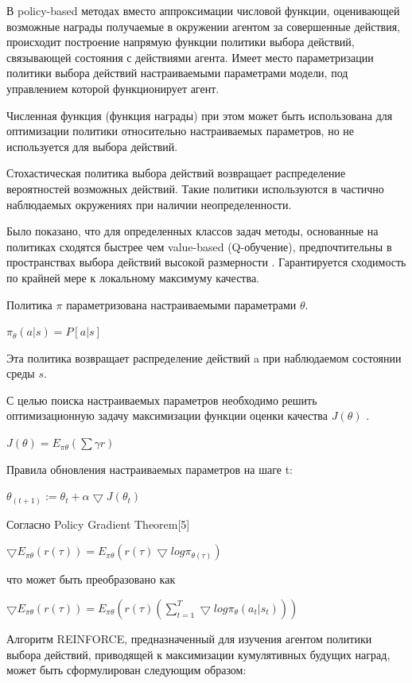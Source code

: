 В policy-based методах вместо аппроксимации числовой функции, оценивающей возможные награды получаемые в окружении агентом за совершенные действия, происходит построение напрямую функции политики выбора действий, связывающей состояния с действиями агента. Имеет место параметризации политики выбора действий настраиваемыми параметрами модели, под управлением которой функционирует агент.

Численная функция (функция награды) при этом может быть использована для оптимизации политики относительно настраиваемых параметров, но не используется для выбора действий.

Стохастическая политика выбора действий возвращает распределение вероятностей возможных действий. Такие политики используются в частично наблюдаемых окружениях при наличии неопределенности.


Было показано, что для определенных классов задач методы, основанные на политиках сходятся быстрее чем value-based (Q-обучение), предпочтительны в пространствах выбора действий высокой размерности . Гарантируется сходимость по крайней мере к локальному максимуму качества.


Политика $\pi$ параметризована настраиваемыми параметрами $\theta$.

$\pi_{\theta} (a|s)= P[a|s]$

Эта политика возвращает распределение действий a при наблюдаемом состоянии среды $s$.

С целью поиска настраиваемых параметров необходимо решить оптимизационную задачу максимизации функции оценки качества $J( \theta )$ .

$J( \theta )=E_{ \pi  \theta } ( \sum  \gamma r)$

Правила обновления настраиваемых параметров на шаге t:

$\theta _{(t+1)} := \theta _{t}+ \alpha  \bigtriangledown J( \theta _t)$


Согласно Policy Gradient Theorem[5]

$\bigtriangledown E_{ \pi  \theta } (r( \tau ) )=E_{ \pi  \theta } (r( \tau ) \bigtriangledown log \pi _{ \theta  ( \tau )})$


что может быть преобразовано как

$\bigtriangledown E_{ \pi  \theta } (r( \tau ) )=E_{ \pi  \theta } (r( \tau )( \sum_{t=1}^{T}  \bigtriangledown log  \pi _{ \theta } (a_t |s_t)))$


Алгоритм REINFORCE, предназначенный для изучения агентом политики выбора действий, приводящей к максимизации кумулятивных будущих наград, может быть сформулирован следующим образом\cite{Sutton1998}:

